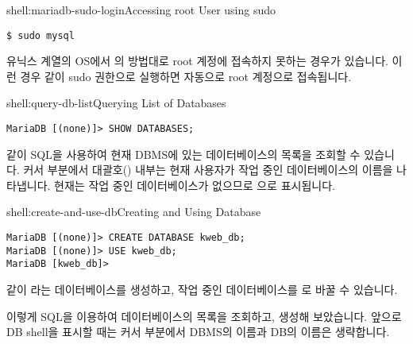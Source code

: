 \begin{shellenv}{shell:mariadb-sudo-login}{Accessing root User using sudo}\begin{verbatim}
$ sudo mysql
\end{verbatim}
\end{shellenv}

유닉스 계열의 OS에서 의 방법대로 root 계정에 접속하지 못하는 경우가 있습니다. 이런 경우 \과 같이 sudo 권한으로 실행하면 자동으로 root 계정으로 접속됩니다.

\begin{shellenv}{shell:query-db-list}{Querying List of Databases}\begin{verbatim}
MariaDB [(none)]> SHOW DATABASES;
\end{verbatim}
\end{shellenv}

\와 같이 SQL을 사용하여 현재 DBMS에 있는 데이터베이스의 목록을 조회할 수 있습니다. 커서 부분에서 대괄호(\cd{[]}) 내부는 현재 사용자가 작업 중인 데이터베이스의 이름을 나타냅니다. 현재는 작업 중인 데이터베이스가 없으므로 으로 표시됩니다.

\begin{shellenv}{shell:create-and-use-db}{Creating and Using Database}\begin{verbatim}
MariaDB [(none)]> CREATE DATABASE kweb_db;
MariaDB [(none)]> USE kweb_db;
MariaDB [kweb_db]>
\end{verbatim}
\end{shellenv}

\와 같이 라는 데이터베이스를 생성하고, 작업 중인 데이터베이스를 로 바꿀 수 있습니다.

이렇게 SQL을 이용하여 데이터베이스의 목록을 조회하고, 생성해 보았습니다. 앞으로 DB shell을 표시할 때는 커서 부분에서 DBMS의 이름과 DB의 이름은 생략합니다.

